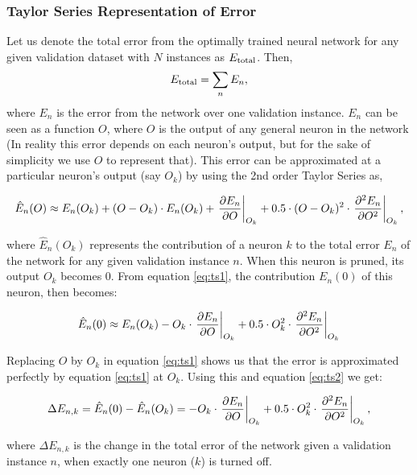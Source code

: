 \subsubsection{Taylor Series Representation of Error}
Let us denote the total error from the optimally trained neural network for any given validation dataset with $N$ instances as $E_{\mathrm{total}}$. Then,
\begin{align}
E_{\mathrm{total}} = \sum_n E_n,
\end{align}
where $E_n$ is the error from the network over one validation instance. $E_n$ can be seen as a function $O$, where $O$ is the output of any general neuron in the network (In reality this error depends on each neuron's output, but for the sake of simplicity we use $O$ to represent that). This error can be approximated at a particular neuron's output (say $O_k$) by using the 2nd order Taylor Series as,

\begin{align}
\hat E_n(O) \approx E_n(O_k) + (O-O_k)\cdot E_n(O_k) + \left.\pdv{E_n}{O}\right|_{O_k} +  0.5\cdot (O-O_k)^2\cdot \left.\pdv[2]{E_n}{O}\right|_{O_k}\label{eq:ts1},
\end{align}

where $\hat E_n(O_k)$ represents the contribution of a neuron $k$ to the total error $E_n$ of the network for any given validation instance $n$. When this neuron is pruned, its output $O_k$ becomes 0. From equation \ref{eq:ts1}, the contribution $E_n(0)$ of this neuron, then becomes:

\begin{align}
\hat E_n(0) \approx E_n(O_k) - O_k\cdot \left.\pdv{E_n}{O}\right|_{O_k} +  0.5\cdot O_k^2\cdot \left.\pdv[2]{E_n}{O}\right|_{O_k}\label{eq:ts2}
\end{align}

Replacing $O$ by $O_k$ in equation \ref{eq:ts1} shows us that the error is approximated perfectly by equation \ref{eq:ts1} at $O_k$. Using this and equation \ref{eq:ts2} we get:

\begin{align}
\Delta E_{n,k} = \hat E_n(0) - \hat E_n(O_k)= - O_k\cdot \left.\pdv{E_n}{O}\right|_{O_k} + 0.5\cdot O_k^2\cdot \left.\pdv[2]{E_n}{O}\right|_{O_k}\label{eq:ts3},
\end{align}

where $\Delta E_{n,k}$ is the change in the total error of the network given a validation instance $n$, when exactly one neuron ($k$) is turned off.


